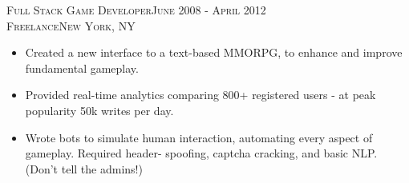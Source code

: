 \textsc{Full Stack Game Developer\hfill June 2008 - April 2012\\}
\textsc{Freelance\hfill New York, NY\\}
\begin{itemize}
	\setlength{\itemsep}{1pt}
	\setlength{\parskip}{0pt}
	\setlength{\parsep}{0pt}
	\setlength{\leftmargin}{-5mm}
	\item Created a new interface to a text-based MMORPG, to enhance and improve fundamental gameplay.
    \item Provided real-time analytics comparing 800+ registered users - at peak popularity 50k writes per day.
    \item Wrote bots to simulate human interaction, automating every aspect of gameplay. Required header-
            spoofing, captcha cracking, and basic NLP. (Don’t tell the admins!)
\end{itemize}

